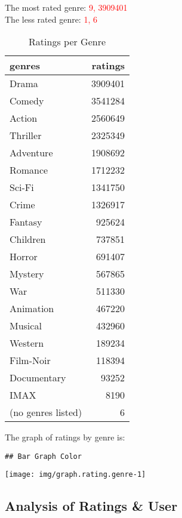 \documentclass[]{article}
\begin{document}
The most rated genre: \textcolor{red}{9, 3909401}\\
The less rated genre: \textcolor{red}{1, 6}

\begin{table}[!h]

\caption{\label{tab:table.rating.genre}Ratings per Genre}
\centering
\begin{tabular}{lr}
\toprule
genres & ratings\\
\midrule
\rowcolor{gray!6}  Drama & 3909401\\
Comedy & 3541284\\
\rowcolor{gray!6}  Action & 2560649\\
Thriller & 2325349\\
\rowcolor{gray!6}  Adventure & 1908692\\
\addlinespace
Romance & 1712232\\
\rowcolor{gray!6}  Sci-Fi & 1341750\\
Crime & 1326917\\
\rowcolor{gray!6}  Fantasy & 925624\\
Children & 737851\\
\addlinespace
\rowcolor{gray!6}  Horror & 691407\\
Mystery & 567865\\
\rowcolor{gray!6}  War & 511330\\
Animation & 467220\\
\rowcolor{gray!6}  Musical & 432960\\
\addlinespace
Western & 189234\\
\rowcolor{gray!6}  Film-Noir & 118394\\
Documentary & 93252\\
\rowcolor{gray!6}  IMAX & 8190\\
(no genres listed) & 6\\
\bottomrule
\end{tabular}
\end{table}

The graph of ratings by genre is:

\begin{verbatim}
## Bar Graph Color
\end{verbatim}

\begin{center}\texttt{[image: img/graph.rating.genre-1]} \end{center}

\hypertarget{analysis-of-ratings-user}{%
\subsection{Analysis of Ratings \&
User}\label{analysis-of-ratings-user}}
\end{document}
